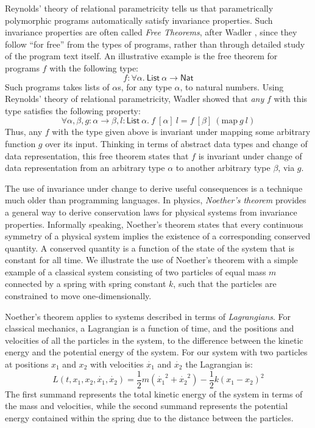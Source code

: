 \documentclass[preprint]{sigplanconf}
\theoremstyle{examplestyle}
\begin{document}
Reynolds' theory of relational parametricity \cite{reynolds83types}
tells us that parametrically polymorphic programs automatically
satisfy invariance properties. Such invariance properties are often
called \emph{Free Theorems}, after Wadler \cite{wadler89theorems},
since they follow ``for free'' from the types of programs, rather than
through detailed study of the program text itself. An illustrative
example is the free theorem for programs $f$ with the following type:
\begin{displaymath}
  f : \forall \alpha.~\mathsf{List}~\alpha \to \mathsf{Nat}
\end{displaymath}
Such programs takes lists of $\alpha$s, for any type $\alpha$, to
natural numbers. Using Reynolds' theory of relational parametricity,
Wadler showed that \emph{any} $f$ with this type satisfies the
following property:
\begin{displaymath}
  \forall \alpha, \beta, g : \alpha \to \beta, l : \mathsf{List}~\alpha.~f~[\alpha]~l = f~[\beta]~(\mathrm{map}~g~l)
\end{displaymath}
Thus, any $f$ with the type given above is invariant under mapping
some arbitrary function $g$ over its input. Thinking in terms of
abstract data types and change of data representation, this free
theorem states that $f$ is invariant under change of data
representation from an arbitrary type $\alpha$ to another arbitrary
type $\beta$, via $g$.

The use of invariance under change to derive useful consequences is a
technique much older than programming languages. In physics,
\emph{Noether's theorem} \cite{noether71} provides a general way to
derive conservation laws for physical systems from invariance
properties. Informally speaking, Noether's theorem states that every
continuous symmetry of a physical system implies the existence of a
corresponding conserved quantity. A conserved quantity is a function
of the state of the system that is constant for all time. We
illustrate the use of Noether's theorem with a simple example of a
classical system consisting of two particles of equal mass $m$
connected by a spring with spring constant $k$, such that the
particles are constrained to move one-dimensionally.


Noether's theorem applies to systems described in terms of
\emph{Lagrangians}. For classical mechanics, a Lagrangian is a
function of time, and the positions and velocities of all the
particles in the system, to the difference between the kinetic energy
and the potential energy of the system. For our system with two
particles at positions $x_1$ and $x_2$ with velocities $\dot{x_1}$ and
$\dot{x_2}$ the Lagrangian is:
\begin{equation}\label{eq:coupled-spring-lagrangian}
  L(t,x_1,x_2,\dot{x_1},\dot{x_2}) = \frac{1}{2}m(\dot{x_1}^2 + \dot{x_2}^2) - \frac{1}{2}k(x_1 - x_2)^2
\end{equation}
The first summand represents the total kinetic energy of the system in
terms of the mass and velocities, while the second summand represents
the potential energy contained within the spring due to the distance
between the particles.
\end{document}
